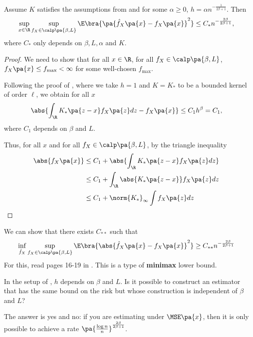 \begin{theorem}\label{thm:1}
  Assume $K$ satisfies the assumptions from  and for some $\alpha\geq 0$, $h= \alpha n^{-\frac{1}{2\beta +1 }}$. Then
  \begin{equation}
    \sup_{x\in \R}\sup_{f_X\in \calp\pa{\beta,L}}\E\bra{\pa{\hat{f}_X\pa{x}- f_X\pa{x}}^2}\leq C_\ast n^{-\frac{2\beta}{2\beta + 1}},
  \end{equation}
  where $C_\ast$ only depends on $\beta,L,\alpha$ and $K$.
\end{theorem}
\begin{proof}
  We need to show that for all $x\in\R$, for all $f_X\in \calp\pa{\beta,L}$, $f_X\pa{x}\leq f_{\max}<\infty$ for some well-chosen $f_{\max}$.

  Following the proof of , where we take $h=1$ and $K=K_\ast$ to be a bounded kernel of order $\ell$, we obtain for all $x$
  \begin{equation}
  \abs{  \int_\R K_{\ast}\pa{z-x}f_X\pa{z} dz - f_X\pa{x}} \leq C_1 h^\beta = C_1,
  \end{equation}
  where $C_1$ depends on $\beta$ and $L$.

  Thus, for all $x$ and for all $f_X\in\calp\pa{\beta,L}$, by the triangle inequality
  \begin{equation}
  \begin{split}
  \abs{f_X\pa{x}}&\leq C_1 + \abs{\int_\R K_{\ast}\pa{z-x}f_X\pa{z} dz}\\
  &\leq  C_1 + \int_\R \abs{K_{\ast}\pa{z-x}} f_X\pa{z} dz \\
  &\leq C_1 + \norm{K_\ast}_\infty \int f_X\pa{z} dz
  \end{split}
  \end{equation}
\end{proof}

\begin{remark}
  We can show that there exists $C_{\ast\ast}$ such that
  \begin{equation}
    \inf_{\hat{f}_X}\sup_{f_X \in \calp\pa{\beta,L}} \E\bra{\abs{\hat{f}_X\pa{x}-f_X\pa{x}}^2}\geq C_{\ast\ast} n^{-\frac{2\beta}{2\beta +1}}
  \end{equation}
  For this, read pages 16-19 in \cite{tsybakov}. This is a type of \textbf{minimax} lower bound.
\end{remark}

\begin{remark}
  In the setup of , $h$ depends on $\beta$ and $L$. Is it possible to construct an estimator that has the same bound on the risk but whose construction is independent of $\beta$ and $L$?

  The answer is yes and no: if you are estimating under $\MSE\pa{x}$, then it is only possible to achieve a rate $\pa{\frac{\log n}{n}}^{\frac{2\beta}{2\beta +1}}$.
\end{remark}

